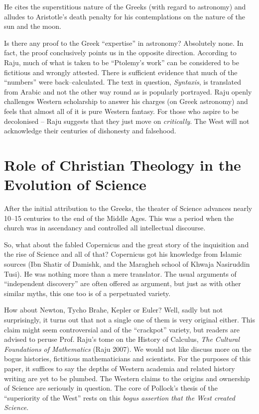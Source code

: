 He cites the superstitious nature of the Greeks (with regard to astronomy) and alludes to Aristotle’s death penalty for his contemplations on the nature of the sun and the moon.

Is there any proof to the Greek “expertise” in astronomy? Absolutely none. In fact, the proof conclusively points us in the opposite direction. According to Raju, much of what is taken to be “Ptolemy’s work” can be considered to be fictitious and wrongly attested. There is sufficient evidence that much of the “numbers” were back–calculated. The text in question, \textit{Syntaxis}, is translated from Arabic and not the other way round as is popularly portrayed. Raju openly challenges Western scholarship to answer his charges (on Greek astronomy) and feels that almost all of it is pure Western fantasy. For those who aspire to be decolonised – Raju suggests that they just move on \textit{critically}. The West will not acknowledge their centuries of dishonesty and falsehood.


\section*{Role of Christian Theology in the Evolution of Science}

After the initial attribution to the Greeks, the theater of Science advances nearly 10–15 centuries to the end of the Middle Ages. This was a period when the church was in ascendancy and controlled all intellectual discourse.

So, what about the fabled Copernicus and the great story of the inquisition and the rise of Science and all of that? Copernicus got his knowledge from Islamic sources (Ibn Shatir of Damishk, and the Maragheh school of Khwaja Nasiruddin Tusi). He was nothing more than a mere translator. The usual arguments of “independent discovery” are often offered as argument, but just as with other similar myths, this one too is of a perpetuated variety.

How about Newton, Tycho Brahe, Kepler or Euler? Well, sadly but not surprisingly, it turns out that not a single one of them is very original either. This claim might seem controversial and of the “crackpot” variety, but readers are advised to peruse Prof. Raju’s tome on the History of Calculus, \textit{The Cultural Foundations of Mathematics} (Raju 2007). We would not like discuss more on the bogus histories, fictitious mathematicians and scientists. For the purposes of this paper, it suffices to say the depths of Western academia and related history writing are yet to be plumbed. The Western claims to the origins and ownership of Science are seriously in question. The core of Pollock’s thesis of the “superiority of the West” rests on this \textit{bogus assertion that the West created Science.}


